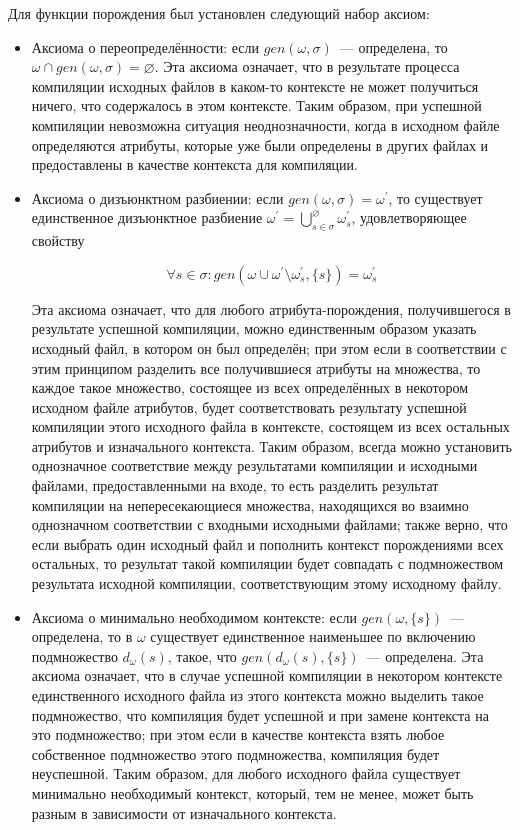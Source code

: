 Для функции порождения был установлен следующий набор аксиом:

\begin{itemize}
	\item Аксиома о переопределённости: если $gen(\omega,\sigma)$~--- определена, то $\omega \cap gen(\omega,\sigma) = \varnothing$. Эта аксиома означает, что в результате процесса компиляции исходных файлов в каком-то контексте не может получиться ничего, что содержалось в этом контексте. Таким образом, при успешной компиляции невозможна ситуация неоднозначности, когда в исходном файле определяются атрибуты, которые уже были определены в других файлах и предоставлены в качестве контекста для компиляции.
	
	\item Аксиома о дизъюнктном разбиении: если $gen(\omega,\sigma) = \omega^\prime$, то существует единственное дизъюнктное разбиение $\omega^\prime=\bigcup^\varnothing_{s\in\sigma}\omega^\prime_s$, 
	удовлетворяющее свойству 

	$$\forall s\in\sigma : gen(\omega\cup\omega^\prime\setminus\omega^\prime_s,\{s\})=\omega^\prime_s$$
	
	Эта аксиома означает, что для любого атрибута-порождения, получившегося в результате успешной компиляции, можно единственным образом указать исходный файл, в котором он был определён; при этом если в соответствии с этим принципом разделить все получившиеся атрибуты на множества, то каждое такое множество, состоящее из всех определённых в некотором исходном файле атрибутов, будет соответствовать результату успешной компиляции этого исходного файла в контексте, состоящем из всех остальных атрибутов и изначального контекста. Таким образом, всегда можно установить однозначное соответствие между результатами компиляции и исходными файлами, предоставленными на входе, то есть разделить результат компиляции на непересекающиеся множества, находящихся во взаимно однозначном соответствии с входными исходными файлами; также верно, что если выбрать один исходный файл и пополнить контекст порождениями всех остальных, то результат такой компиляции будет совпадать с подмножеством результата исходной компиляции, соответствующим этому исходному файлу.

	\item Аксиома о минимально необходимом контексте: если $gen(\omega,\{s\})$~--- определена, то в $\omega$ существует единственное наименьшее по включению подмножество $d_\omega(s)$, такое, что $gen(d_\omega(s), \{s\})$~--- определена. Эта аксиома означает, что в случае успешной компиляции в некотором контексте единственного исходного файла из этого контекста можно выделить такое подмножество, что компиляция будет успешной и при замене контекста на это подмножество; при этом если в качестве контекста взять любое собственное подмножество этого подмножества, компиляция будет неуспешной. Таким образом, для любого исходного файла существует минимально необходимый контекст, который, тем не менее, может быть разным в зависимости от изначального контекста.


\end{itemize}
